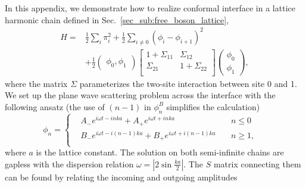 
In this appendix, we demonstrate how to realize conformal interface in a lattice harmonic chain defined in Sec.~\ref{sec_sub:free_boson_lattice},
\begin{equation}
\begin{aligned}
H =& \frac{1}{2} \sum_i \pi_i^2  +  \frac{1}{2} \sum_{i\ne 0 }  ( \phi_i - \phi_{i+1} )^2  \\
 &+ \frac{1}{2} \begin{pmatrix}  \phi_0, \phi_1 \end{pmatrix}
\begin{bmatrix}
1 + \Sigma_{11}  & \Sigma_{12} \\
\Sigma_{21} &  1 + \Sigma_{22} \\
\end{bmatrix}
\begin{pmatrix}
  \phi_0 \\
  \phi_1 
\end{pmatrix},
\end{aligned}
\end{equation}
where the matrix $\Sigma$ parameterizes the two-site interaction between site 0 and 1. We set up the plane wave scattering problem across the interface with the following ansatz (the use of $(n-1)$ in $\phi_n^B$ simplifies the calculation)
\begin{equation}
\label{eq:ansatz}
\phi_n
= \left\lbrace
  \begin{aligned}
	& A_{-} e^{i \omega t  - inka}  + A_{+} e^{i \omega t  + inka}  & \quad  n \le 0 \\
	& B_{-} e^{i \omega t  - i(n-1)ka}  + B_{+} e^{i \omega t  + i(n-1)ka} & \quad n \ge 1 ,\\
  \end{aligned} \right. 
 \quad 
\end{equation}
where $a$ is the lattice constant. The solution on both semi-infinite chains are gapless with the dispersion relation $\omega = \left|2\sin\frac{ka}{2}\right|$. The $S$ matrix connecting them can be found by relating the incoming and outgoing amplitudes

